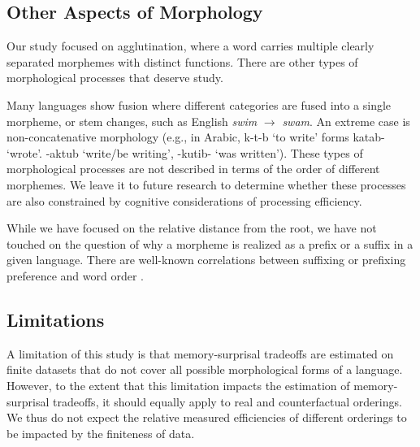 \documentclass[11pt,letterpaper]{article}
\newcommand{\citep}{\parencite}
\begin{document}



\subsection{Other Aspects of Morphology}

Our study focused on agglutination, where a word carries multiple clearly separated morphemes with distinct functions.
There are other types of morphological processes that deserve study.

Many languages show fusion where different categories are fused into a single morpheme, or stem changes, such as English \textit{swim} $\rightarrow$ \textit{swam}.
An extreme case is non-concatenative morphology (e.g., in Arabic, k-t-b `to write' forms katab- `wrote'. -aktub `write/be writing', -kutib- `was written').
These types of morphological processes are not described in terms of the order of different morphemes.
We leave it to future research to determine whether these processes are also constrained by cognitive considerations of processing efficiency.

While we have focused on the relative distance from the root, we have not touched on the question of why a morpheme is realized as a prefix or a suffix in a given language.
There are well-known correlations between suffixing or prefixing preference and word order \citep{greenberg1963universals}.




\subsection{Limitations}


A limitation of this study is that memory-surprisal tradeoffs are estimated on finite datasets that do not cover all possible morphological forms of a language. However, to the extent that this limitation impacts the estimation of memory-surprisal tradeoffs, it should equally apply to real and counterfactual orderings. We thus do not expect the relative measured efficiencies of different orderings to be impacted by the finiteness of data.
\end{document}
